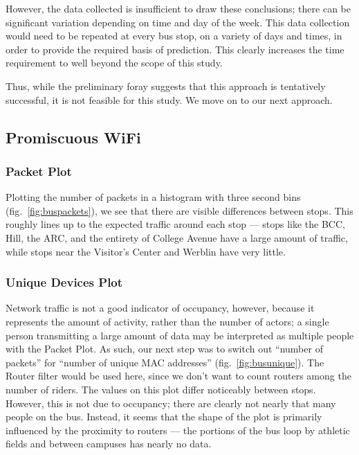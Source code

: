 However, the data collected is insufficient to draw these conclusions; there can be significant variation depending on time and day of the week.
This data collection would need to be repeated at every bus stop, on a variety of days and times, in order to provide the required basis of prediction.
This clearly increases the time requirement to well beyond the scope of this study.
	
Thus, while the preliminary foray suggests that this approach is tentatively successful, it is not feasible for this study.
We move on to our next approach.

\subsection{Promiscuous WiFi}
    
\subsubsection*{Packet Plot}

Plotting the number of packets in a histogram with three second bins (fig.~\ref{fig:buspackets}), we see that there are visible differences between stops.
This roughly lines up to the expected traffic around each stop --- stops like the BCC, Hill, the ARC, and the entirety of College Avenue have a large amount of traffic, while stops near the Visitor's Center and Werblin have very little.

\subsubsection*{Unique Devices Plot}

Network traffic is not a good indicator of occupancy, however, because it represents the amount of activity, rather than the number of actors; a single person transmitting a large amount of data may be interpreted as multiple people with the Packet Plot.
As such, our next step was to switch out ``number of packets'' for ``number of unique MAC addresses'' (fig.~\ref{fig:busunique}).
The Router filter would be used here, since we don't want to count routers among the number of riders.
The values on this plot differ noticeably between stops.
However, this is not due to occupancy; there are clearly not nearly that many people on the bus.
Instead, it seems that the shape of the plot is primarily influenced by the proximity to routers --- the portions of the bus loop by athletic fields and between campuses has nearly no data.

